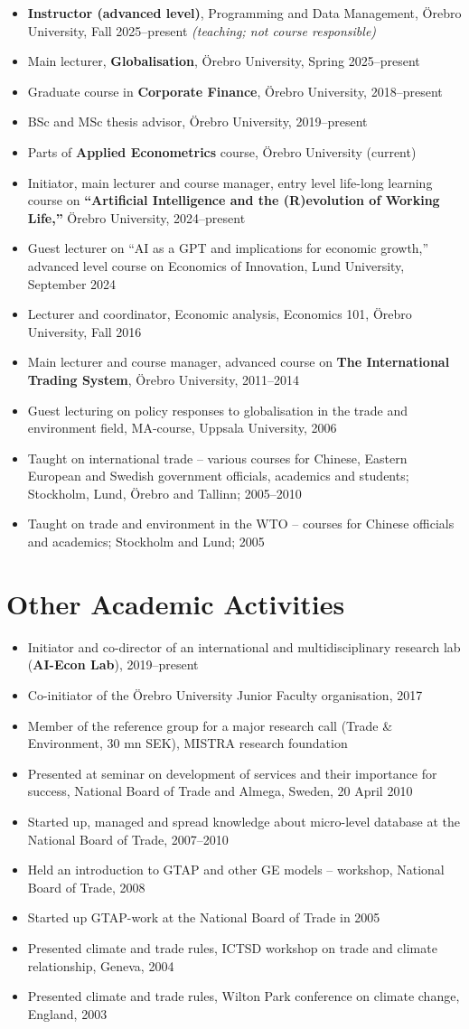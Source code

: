 \documentclass[11pt,a4paper]{article}
\newcommand{\cventry}[1]{\item #1}
\begin{document}
\begin{itemize}
\cventry{\textbf{Instructor (advanced level)}, Programming and Data Management, Örebro University, Fall 2025--present \textit{(teaching; not course responsible)}}
  \cventry{Main lecturer, \textbf{Globalisation}, Örebro University, Spring 2025--present}
  \cventry{Graduate course in \textbf{Corporate Finance}, Örebro University, 2018--present}
  \cventry{BSc and MSc thesis advisor, Örebro University, 2019--present}
  \cventry{Parts of \textbf{Applied Econometrics} course, Örebro University (current)}
  \cventry{Initiator, main lecturer and course manager, entry level life-long learning course on \textbf{``Artificial Intelligence and the (R)evolution of Working Life,''} Örebro University, 2024--present}
  \cventry{Guest lecturer on ``AI as a GPT and implications for economic growth,'' advanced level course on Economics of Innovation, Lund University, September 2024}
  \cventry{Lecturer and coordinator, Economic analysis, Economics 101, Örebro University, Fall 2016}
  \cventry{Main lecturer and course manager, advanced course on \textbf{The International Trading System}, Örebro University, 2011--2014}
  \cventry{Guest lecturing on policy responses to globalisation in the trade and environment field, MA-course, Uppsala University, 2006}
  \cventry{Taught on international trade -- various courses for Chinese, Eastern European and Swedish government officials, academics and students; Stockholm, Lund, Örebro and Tallinn; 2005--2010}
  \cventry{Taught on trade and environment in the WTO -- courses for Chinese officials and academics; Stockholm and Lund; 2005}
\end{itemize}

\section{Other Academic Activities}

\begin{itemize}
  \cventry{Initiator and co-director of an international and multidisciplinary research lab (\textbf{AI-Econ Lab}), 2019--present}
  \cventry{Co-initiator of the Örebro University Junior Faculty organisation, 2017}
  \cventry{Member of the reference group for a major research call (Trade \& Environment, 30 mn SEK), MISTRA research foundation}
  \cventry{Presented at seminar on development of services and their importance for success, National Board of Trade and Almega, Sweden, 20 April 2010}
  \cventry{Started up, managed and spread knowledge about micro-level database at the National Board of Trade, 2007--2010}
  \cventry{Held an introduction to GTAP and other GE models -- workshop, National Board of Trade, 2008}
  \cventry{Started up GTAP-work at the National Board of Trade in 2005}
  \cventry{Presented climate and trade rules, ICTSD workshop on trade and climate relationship, Geneva, 2004}
  \cventry{Presented climate and trade rules, Wilton Park conference on climate change, England, 2003}
\end{itemize}
\end{document}
